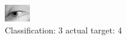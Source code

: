 \begin{figure}[h!]
\begin{center}
\includegraphics[width=0.60\columnwidth]{figures/ID3042_class_3_target_4.png}
\end{center}
\caption{ Classification: 3 actual target: 4}
\label{fig:ID3042_class_3_target_4}
\end{figure}

